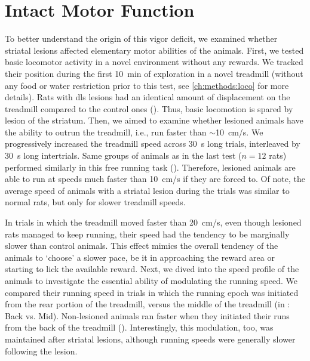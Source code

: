 \section{Intact Motor Function}
\label{ch:lesion:motorOk}

To better understand the origin of this vigor deficit, we examined whether striatal lesions affected elementary motor abilities of the animals.
First, we tested basic locomotor activity in a novel environment without any rewards.
We tracked their position during the first 10~min of exploration in a novel treadmill (without any food or water restriction prior to this test, see \autoref{ch:methods:loco} for more details).
Rats with \gls{dls} lesions had an identical amount of displacement on the treadmill compared to the control ones ().
Thus, basic locomotion is spared by lesion of the striatum.
Then, we aimed to examine whether lesioned animals have the ability to outrun the treadmill, i.e., run faster than $\sim$10~cm/s.
We progressively increased the treadmill speed across 30~s long trials, interleaved by 30~s long intertrials.
Same groups of animals as in the last test ($n=12$ rats) performed similarly in this free running task ().
Therefore, lesioned animals are able to run at speeds much faster than 10~cm/s if they are forced to.
Of note, the average speed of animals with a striatal lesion during the trials was similar to normal rats, but only for slower treadmill speeds.

In trials in which the treadmill moved faster than 20~cm/s, even though lesioned rats managed to keep running, their speed had the tendency to be marginally slower than control animals.
This effect mimics the overall tendency of the animals to `choose' a slower pace, be it in approaching the reward area or starting to lick the available reward.
Next, we dived into the speed profile of the animals to investigate the essential ability of modulating the running speed.
We compared their running speed in trials in which the running epoch was initiated from the rear portion of the treadmill, versus the middle of the treadmill (in : Back vs. Mid).
Non-lesioned animals ran faster when they initiated their runs from the back of the treadmill ().
Interestingly, this modulation, too, was maintained after striatal lesions, although running speeds were generally slower following the lesion.


